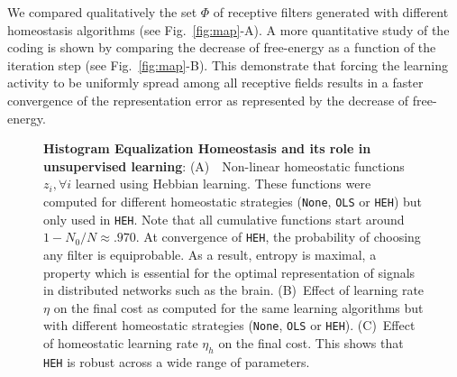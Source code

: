 \documentclass[draft]{article} %
\newcommand{\dico}{\Phi} %
\begin{document}
We compared qualitatively the set $\dico$ of receptive filters generated with different homeostasis algorithms (see Fig.~\ref{fig:map}-A). A more quantitative study of the coding is shown by comparing the decrease of free-energy as a function of the iteration step (see Fig.~\ref{fig:map}-B). This demonstrate that forcing the learning activity to be uniformly spread among all receptive fields results in a faster convergence of the representation error as represented by the decrease of free-energy.
\begin{figure}[!ht]%
\caption{
{\bf Histogram Equalization Homeostasis and its role in unsupervised learning}:
{\sf (A)}~~Non-linear homeostatic functions $z_i, \forall i$ learned using Hebbian learning. These functions were computed for different homeostatic strategies (\texttt{None}, \texttt{OLS} or \texttt{HEH}) but only used in \texttt{HEH}. Note that all cumulative functions start around $1 - N_0/N \approx .970 $. At convergence of \texttt{HEH}, the probability of choosing any filter is equiprobable. As a result, entropy is maximal, a property which is essential for the optimal representation of signals in distributed networks such as the brain.
{\sf (B)}~Effect of learning rate $\eta$ on the final cost as computed for the same learning algorithms but with different homeostatic strategies (\texttt{None}, \texttt{OLS} or \texttt{HEH}).
{\sf (C)}~Effect of homeostatic learning rate $\eta_h$ on the final cost. This shows that \texttt{HEH} is robust across a wide range of parameters.
}
\end{figure}
\end{document}
